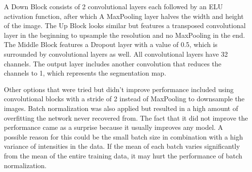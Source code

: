 A Down Block consists of 2 convolutional layers each followed by an ELU activation function, after which A MaxPooling layer halves the width and height of the image. The Up Block looks similar but features a transposed convolutional layer in the beginning to upsample the resolution and no MaxPooling in the end. The Middle Block features a Dropout layer with a value of 0.5, which is surrounded by convolutional layers as well. All convolutional layers have 32 channels. The output layer includes another convolution that reduces the channels to 1, which represents the segmentation map.

Other options that were tried but didn't improve performance included using convolutional blocks with a stride of 2 instead of MaxPooling to downsample the images. Batch normalization was also applied but resulted in a high amount of overfitting the network never recovered from. The fact that it did not improve the performance came as a surprise because it usually improves any model. A possible reason for this could be the small batch size in combination with a high variance of intensities in the data. If the mean of each batch varies significantly from the mean of the entire training data, it may hurt the performance of batch normalization.

\newpage

